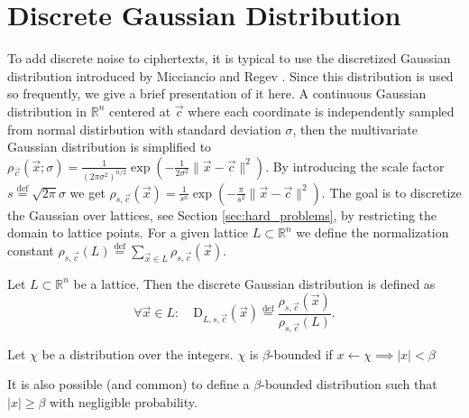 \section{Discrete Gaussian Distribution}
To add discrete noise to ciphertexts, it is typical to use the discretized Gaussian distribution introduced by Micciancio and Regev \cite{disc-gauss}. Since this distribution is used so frequently, we give a brief presentation of it here. A continuous Gaussian distribution in $\mathbb{R}^n$ centered at $\vec{c}$ where each coordinate is independently sampled from normal distirbution with standard deviation $\sigma$, then the multivariate Gaussian distribution is simplified to $\rho_{\vec{c}}(\vec{x}; \sigma)=\frac{1}{\left(2 \pi \sigma^2\right)^{n / 2}} \exp \left( -\frac{1}{2 \sigma^2} \| \vec{x}-\vec{c} \| ^2\right)$. By introducing the scale factor $s \stackrel{\mathrm{def}}{=} \sqrt{2\pi}\sigma$ we get $\rho_{s, \vec{c}}(\vec{x})=\frac{1}{s^n} \exp \left(-\frac{\pi}{s^2} \| \vec{x}-\vec{c} \| ^2\right)$.
The goal is to discretize the Gaussian over lattices, see Section \ref{sec:hard_problems}, by restricting the domain to lattice points. For a given lattice $L \subset \mathbb{R}^n$ we define the normalization constant $\rho_{s, \vec{c}}(L) \stackrel{\mathrm{def}}{=} \sum_{\vec{x} \in L} \rho_{s, \vec{c}}(\vec{x})$.
\begin{definition}\label{Disc-Gauss}
    Let $L \subset \mathbb{R}^n$ be a lattice. Then the discrete Gaussian distribution is defined as
    \begin{equation*}
        \forall \vec{x} \in L \colon \quad \textrm{D}_{L, s, \vec{c}}(\vec{x}) \stackrel{\mathrm{def}}{=} \frac{\rho_{s, \vec{c}}(\vec{x})}{\rho_{s, \vec{c}}(L)}.
    \end{equation*}            
\end{definition}
\begin{definition}
    Let $\chi$ be a distribution over the integers. $\chi$ is $\beta$-bounded if $x \leftarrow \chi \implies |x| < \beta$
\end{definition}
\begin{remark}
    It is also possible (and common) to define a $\beta$-bounded distribution such that $|x| \geq \beta$ with negligible probability.
\end{remark}
